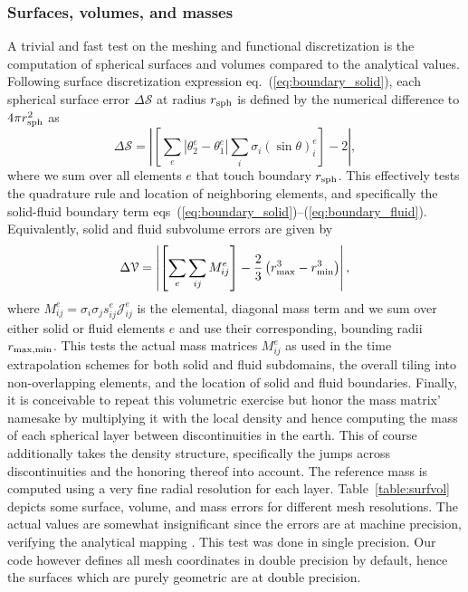 \documentclass[11pt,letter,fleqn,english,notitlepage]{article}
\newcommand{\eq}{\begin{equation}} \newcommand{\en}{\end{equation}}
\begin{document}
\subsubsection{Surfaces, volumes, and masses}
%
A trivial and fast test on the meshing and functional discretization 
is the computation of spherical surfaces and volumes compared to the analytical 
values. Following surface discretization expression eq.~(\ref{eq:boundary_solid}),
each spherical surface error $\Delta {\mathcal S}$ at radius 
$r_{\rm sph}$ is defined by the numerical difference to $4\pi r_{\rm sph}^2$ as
%
\eq
\Delta {\mathcal S}=\left| \left[\sum_e
\left| \theta_2^e - \theta_1^e \right| \sum_i  \sigma_i \left(\sin{\theta}\right)^e_i \right]-
2\right|,
\en
%
where we sum over all elements $e$ that touch boundary $r_{\rm sph}$. 
This effectively tests the quadrature rule and location of neighboring elements, 
and specifically the solid-fluid boundary term 
eqs~(\ref{eq:boundary_solid})--(\ref{eq:boundary_fluid}).
%
Equivalently, solid and fluid subvolume errors are given by
%
\eq
\Delta {\mathcal V}=\left| \left[\sum_e
\sum_{ij} M_{ij}^e  \right]- 
\frac{2}{3}\left(r^3_{\rm max} -r^3_{\rm min} \right)\right|,
\en
%
where $M_{ij}^e=\sigma_i\sigma_j s_{ij}^e {\mathcal J}_{ij}^e $ is the elemental, 
diagonal mass term and we sum over either solid or fluid elements $e$ and use their 
corresponding, bounding radii $r_{\rm max,min}$. This tests the actual mass 
matrices $M_{ij}^e$ as used in the time extrapolation schemes 
for both solid and fluid subdomains, the overall tiling into non-overlapping 
elements, and the location of solid and fluid boundaries. 
Finally, it is conceivable to repeat this volumetric exercise but honor the mass 
matrix' namesake by multiplying it with the local density and hence computing 
the mass of each spherical layer between discontinuities in the earth. 
This of course additionally takes the density structure, specifically the jumps 
across discontinuities and the honoring thereof into account. 
The reference mass is computed using a very fine radial resolution for each 
layer. Table~\ref{table:surfvol}
depicts some surface, volume, and mass errors for different mesh resolutions.
The actual values are somewhat insignificant since the errors are at machine 
precision, verifying the analytical mapping \citep[][Appendix~A]{nissen+:07b}. 
This test was done in single precision. Our code however defines all 
mesh coordinates in double precision by default, hence the surfaces which are 
purely geometric are at double precision.
%
\end{document}

